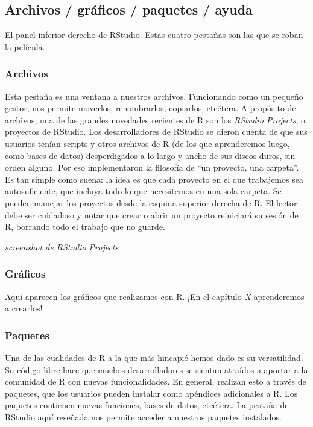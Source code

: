 \documentclass[]{book}
\begin{document}
\subsection{Archivos / gráficos / paquetes /
ayuda}\label{archivos-graficos-paquetes-ayuda}

El panel inferior derecho de RStudio. Estas cuatro pestañas son las que
se roban la película.

\subsubsection{Archivos}\label{archivos}

Esta pestaña es una ventana a nuestros archivos. Funcionando como un
pequeño gestor, nos permite moverlos, renombrarlos, copiarlos, etcétera.
A propósito de archivos, una de las grandes novedades recientes de R son
los \emph{RStudio Projects}, o proyectos de RStudio. Los desarrolladores
de RStudio se dieron cuenta de que sus usuarios tenían scripts y otros
archivos de R (de los que aprenderemos luego, como bases de datos)
desperdigados a lo largo y ancho de sus discos duros, sin orden alguno.
Por eso implementaron la filosofía de ``un proyecto, una carpeta''. Es
tan simple como suena: la idea es que cada proyecto en el que trabajemos
sea autosuficiente, que incluya todo lo que necesitemos en una sola
carpeta. Se pueden manejar los proyectos desde la esquina superior
derecha de R. El lector debe ser cuidadoso y notar que crear o abrir un
proyecto reiniciará su sesión de R, borrando todo el trabajo que no
guarde.

\emph{screenshot de RStudio Projects}

\subsubsection{Gráficos}\label{graficos}

Aquí aparecen los gráficos que realizamos con R. ¡En el capítulo
\emph{X} aprenderemos a crearlos!

\subsubsection{Paquetes}\label{paquetes}

Una de las cualidades de R a la que más hincapié hemos dado es su
versatilidad. Su código libre hace que muchos desarrolladores se sientan
atraídos a aportar a la comunidad de R con nuevas funcionalidades. En
general, realizan esto a través de paquetes, que los usuarios pueden
instalar como apéndices adicionales a R. Los paquetes contienen nuevas
funciones, bases de datos, etcétera. La pestaña de RStudio aquí reseñada
nos permite acceder a nuestros paquetes instalados.
\end{document}
